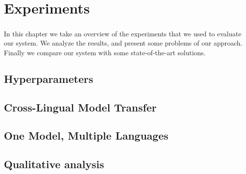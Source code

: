 \chapter{Experiments}
\label{chpt:6}
\paragraph{}
In this chapter we take an overview of the experiments that we used to evaluate our system. We analyze the results, and present some problems of our approach. Finally we compare our system with some state-of-the-art solutions.


\section{Hyperparameters}


\section{Cross-Lingual Model Transfer}


\section{One Model, Multiple Languages}



\section{Qualitative analysis}